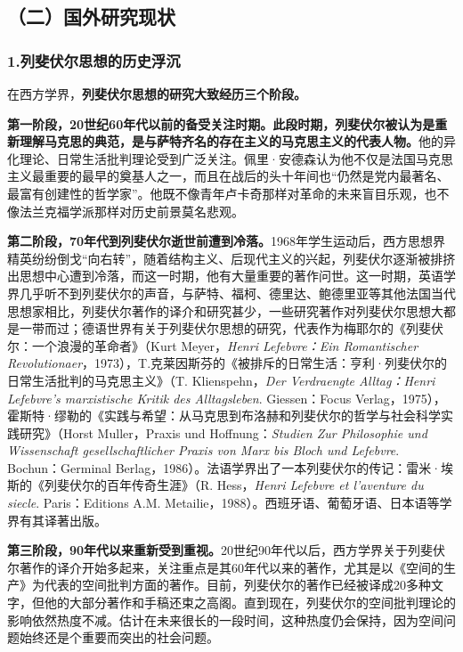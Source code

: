 \documentclass[UTF8, fontset = sourcesans, a4paper, oneside, zihao =
-4, scheme=chinese, no-math, space=true]{ctexbook}
\begin{document}
\subsection{（二）国外研究现状}\label{part0004.htmlux5cux23d002}

\subsubsection{1.列斐伏尔思想的历史浮沉}\label{part0004.htmlux5cux23e003}

在西方学界，\textbf{列斐伏尔思想的研究大致经历三个阶段。}

\textbf{第一阶段，20世纪60年代以前的备受关注时期。此段时期，列斐伏尔被认为是重新理解马克思的典范，是与萨特齐名的存在主义的马克思主义的代表人物。}他的异化理论、日常生活批判理论受到广泛关注。佩里·安德森认为他不仅是法国马克思主义最重要的最早的奠基人之一，而且在战后的头十年间也``仍然是党内最著名、最富有创建性的哲学家''。他既不像青年卢卡奇那样对革命的未来盲目乐观，也不像法兰克福学派那样对历史前景莫名悲观。

\textbf{第二阶段，70年代到列斐伏尔逝世前遭到冷落。}1968年学生运动后，西方思想界精英纷纷倒戈``向右转''，随着结构主义、后现代主义的兴起，列斐伏尔逐渐被排挤出思想中心遭到冷落，而这一时期，他有大量重要的著作问世。这一时期，英语学界几乎听不到列斐伏尔的声音，与萨特、福柯、德里达、鲍德里亚等其他法国当代思想家相比，列斐伏尔著作的译介和研究甚少，一些研究著作对列斐伏尔思想大都是一带而过；德语世界有关于列斐伏尔思想的研究，代表作为梅耶尔的《列斐伏尔：一个浪漫的革命者》（Kurt
Meyer，\emph{Henri Lefebvre：Ein Romantischer
Revolutionaer}，1973），T.克莱因斯芬的《被排斥的日常生活：亨利·列斐伏尔的日常生活批判的马克思主义》（T.
Klienspehn，\emph{Der Verdraengte Alltag：Henri Lefebvre's marxistische
Kritik des Alltagsleben}. Giessen：Focus
Verlag，1975），霍斯特·缪勒的《实践与希望：从马克思到布洛赫和列斐伏尔的哲学与社会科学实践研究》（Horst
Muller，Praxis und Hoffnung：\emph{Studien Zur Philosophie und
Wissenschaft gesellschaftlicher Praxis von Marx bis Bloch und Lefebvre}.
Bochun：Germinal
Berlag，1986）。法语学界出了一本列斐伏尔的传记：雷米·埃斯的《列斐伏尔的百年传奇生涯》（R.
Hess，\emph{Henri Lefebvre et l'aventure du siecle}. Paris：Editions
A.M. Metailie，1988）。西班牙语、葡萄牙语、日本语等学界有其译著出版。

\textbf{第三阶段，90年代以来重新受到重视。}20世纪90年代以后，西方学界关于列斐伏尔著作的译介开始多起来，关注重点是其60年代以来的著作，尤其是以《空间的生产》为代表的空间批判方面的著作。目前，列斐伏尔的著作已经被译成20多种文字，但他的大部分著作和手稿还束之高阁。直到现在，列斐伏尔的空间批判理论的影响依然热度不减。估计在未来很长的一段时间，这种热度仍会保持，因为空间问题始终还是个重要而突出的社会问题。
\end{document}
